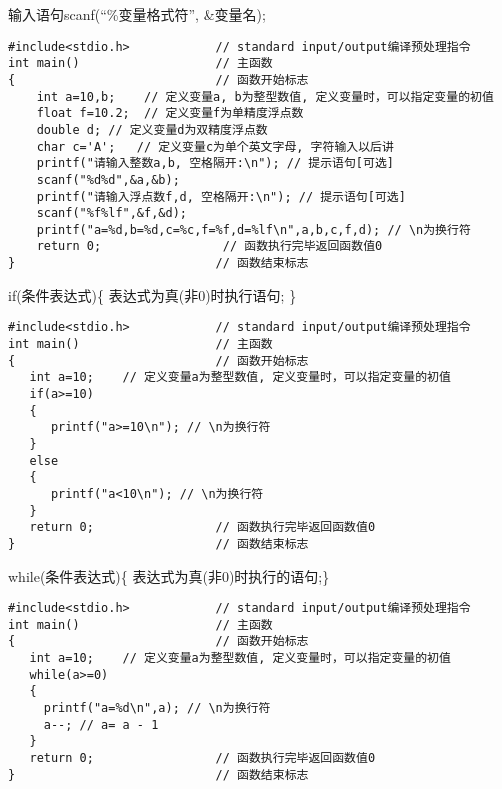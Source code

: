 \begin{frame}[fragile]{输入语句scanf(``\%变量格式符'', \&变量名);}
\begin{lstlisting}
#include<stdio.h>            // standard input/output编译预处理指令
int main()                   // 主函数
{                            // 函数开始标志
    int a=10,b;    // 定义变量a, b为整型数值, 定义变量时，可以指定变量的初值
    float f=10.2;  // 定义变量f为单精度浮点数
    double d; // 定义变量d为双精度浮点数
    char c='A';   // 定义变量c为单个英文字母, 字符输入以后讲
    printf("请输入整数a,b, 空格隔开:\n"); // 提示语句[可选]
    scanf("%d%d",&a,&b);
    printf("请输入浮点数f,d, 空格隔开:\n"); // 提示语句[可选]
    scanf("%f%lf",&f,&d);
    printf("a=%d,b=%d,c=%c,f=%f,d=%lf\n",a,b,c,f,d); // \n为换行符
    return 0;                 // 函数执行完毕返回函数值0
}                            // 函数结束标志
\end{lstlisting}
\end{frame}

\begin{frame}[fragile]{if(条件表达式)\{ 表达式为真(非0)时执行语句; \}}
\begin{lstlisting}
#include<stdio.h>            // standard input/output编译预处理指令
int main()                   // 主函数
{                            // 函数开始标志
   int a=10;    // 定义变量a为整型数值, 定义变量时，可以指定变量的初值
   if(a>=10)
   {
      printf("a>=10\n"); // \n为换行符
   }
   else
   {
      printf("a<10\n"); // \n为换行符
   }
   return 0;                 // 函数执行完毕返回函数值0
}                            // 函数结束标志
\end{lstlisting}
\end{frame}

\begin{frame}[fragile]{while(条件表达式)\{ 表达式为真(非0)时执行的语句;\}}
\begin{lstlisting}
#include<stdio.h>            // standard input/output编译预处理指令
int main()                   // 主函数
{                            // 函数开始标志
   int a=10;    // 定义变量a为整型数值, 定义变量时，可以指定变量的初值
   while(a>=0)
   {
     printf("a=%d\n",a); // \n为换行符
     a--; // a= a - 1
   }
   return 0;                 // 函数执行完毕返回函数值0
}                            // 函数结束标志
\end{lstlisting}
\end{frame}



